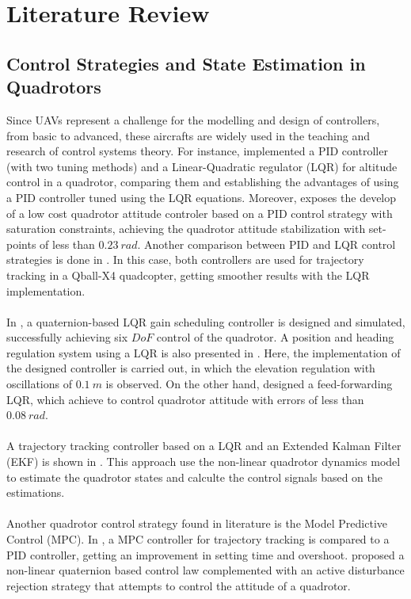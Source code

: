 \section{Literature Review}

\subsection{Control Strategies and State Estimation in Quadrotors}
Since UAVs represent a challenge for the modelling and design of controllers, from basic to advanced, these aircrafts are widely used in the teaching and research of control systems theory. For instance, \cite{Argentim2013} implemented a PID controller (with two tuning methods) and a Linear-Quadratic regulator (LQR) for altitude control in a quadrotor, comparing them and establishing the advantages of using a PID controller tuned using the LQR equations. Moreover, \cite{Silva2016} exposes the develop of a low cost quadrotor attitude controler based on a PID control strategy with saturation constraints, achieving the quadrotor attitude stabilization with set-points of less than $0.23\ rad$. Another comparison between PID and LQR control strategies is done in \cite{Liu2016}. In this case, both controllers are used for trajectory tracking in a Qball-X4 quadcopter, getting smoother results with the LQR implementation.
\\\\
In \cite{Reyes-Valeria2013}, a quaternion-based LQR gain scheduling controller is designed and simulated, successfully achieving six $DoF$ control of the quadrotor. A position and heading regulation system using a LQR is also presented in \cite{Dong2015}. Here, the implementation of the designed controller is carried out, in which the elevation regulation with oscillations of $0.1\ m$ is observed. On the other hand, \cite{Fan2017} designed a feed-forwarding LQR, which achieve to control quadrotor attitude with errors of less than $0.08\ rad$.
\\\\
A trajectory tracking controller based on a LQR and an Extended Kalman Filter (EKF) is shown in \cite{Zhang2016}. This approach use the non-linear quadrotor dynamics model to estimate the quadrotor states and calculte the control signals based on the estimations.
\\\\
Another quadrotor control strategy found in literature is the Model Predictive Control (MPC). In \cite{Configuration2017}, a MPC controller for trajectory tracking is compared to a PID controller, getting an improvement in setting time and overshoot. \cite{Castillo201603a} proposed a non-linear quaternion based control law complemented with an active disturbance rejection strategy that attempts to control the attitude of a quadrotor.
